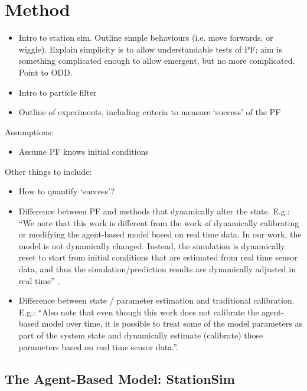 \section{Method\label{Method}}

\begin{itemize}
\item Intro to station sim. Outline simple behaviours (i.e. move forwards, or wiggle). Explain simplicity is to allow understandable tests of PF; aim is something complicated enough to allow emergent, but no more complicated. Point to ODD. 
\item Intro to particle filter
\item Outline of experiments, including criteria to measure `success' of the PF
\end{itemize}

Assumptions:

\begin{itemize}
\item Assume PF knows initial conditions
\end{itemize}

Other things to include: 
\begin{itemize}
\item How to quantify `success'?
\item Difference between PF and methods that dynamically alter the state. E.g.: ``We note that this work is different from the work of dynamically calibrating or modifying the agent-based model based on real time data. In our work, the model is not dynamically changed. Instead, the simulation is dynamically reset to start from initial conditions that are estimated from real time sensor data, and thus the simulation/prediction results are dynamically adjusted in real time'' \citep{wang_data_2015}.
\item Difference between state / parameter estimation and traditional calibration. E.g.: ``Also note that even though this work does not calibrate the agent-based model over time, it is possible to treat some of the model parameters as part of the system state and dynamically estimate (calibrate) those parameters based on real time sensor data.''\citep{wang_data_2015}.

\end{itemize}


\subsection{The Agent-Based Model: StationSim}

